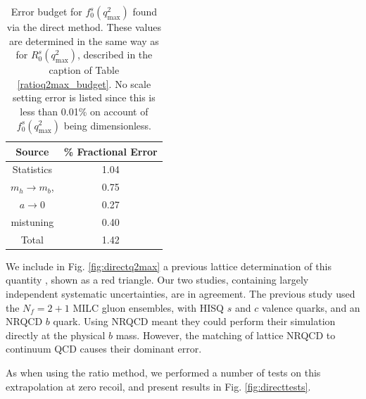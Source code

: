 \begin{table}[htb!]
  \begin{center}
    \begin{tabular}{c c}
      \hline
      Source & \% Fractional Error \\ [0.5ex]
      \hline
      Statistics & 1.04  \\ [1ex]
      $m_h \to m_b$, & 0.75  \\ [1ex]
      $a\to 0$ & 0.27  \\ [1ex]
      mistuning & 0.40 \\ [1ex]
      \hline
      Total & 1.42 \\ [1ex]
      \hline
    \end{tabular}
  \end{center}
  \caption{Error budget for $f_0^s(q^2_{\text{max}})$ found via the direct method. These values are determined in the same way as for $R_0^s(q^2_{\text{max}})$, described in the caption of Table \ref{ratioq2max_budget}. No scale setting error is listed since this is less than 0.01\% on account of $f_0^s(q^2_{\text{max}})$ being dimensionless. \label{directq2max_budget}}
\end{table}

We include in Fig. \ref{fig:directq2max} a previous lattice determination of this quantity \cite{Monahan:2017uby}, shown as a red triangle. Our two studies, containing largely independent systematic uncertainties, are in agreement. The previous study used the $N_f=2+1$ MILC gluon ensembles, with HISQ $s$ and $c$ valence quarks, and an NRQCD $b$ quark. Using NRQCD meant they could perform their simulation directly at the physical $b$ mass. However, the matching of lattice NRQCD to continuum QCD causes their dominant error.

As when using the ratio method, we performed a number of tests on this extrapolation at zero recoil, and present results in Fig. \ref{fig:directtests}.

